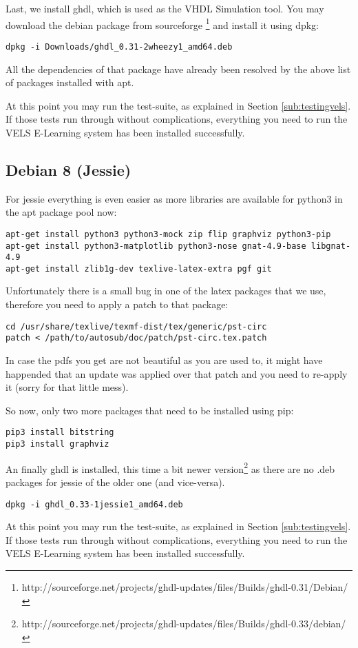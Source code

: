 Last, we install ghdl, which is used as the VHDL Simulation tool. You may download
the debian package from sourceforge \footnote{http://sourceforge.net/projects/ghdl-updates/files/Builds/ghdl-0.31/Debian/} and install it using dpkg:

\begin{verbatim}
dpkg -i Downloads/ghdl_0.31-2wheezy1_amd64.deb
\end{verbatim}

All the dependencies of that package have already been resolved by the above
list of packages installed with apt.

At this point you may run the test-suite, as explained in Section \ref{sub:testingvels}.
If those tests run through without complications, everything you need to run the VELS
E-Learning system has been installed successfully.



\subsection{Debian 8 (Jessie)}

For jessie everything is even easier as more libraries are available for python3 in the
apt package pool now:

\begin{verbatim}
apt-get install python3 python3-mock zip flip graphviz python3-pip
apt-get install python3-matplotlib python3-nose gnat-4.9-base libgnat-4.9
apt-get install zlib1g-dev texlive-latex-extra pgf git
\end{verbatim}

Unfortunately there is a small bug in one of the latex packages that we use,
therefore you need to apply a patch to that package:

\begin{verbatim}
cd /usr/share/texlive/texmf-dist/tex/generic/pst-circ
patch < /path/to/autosub/doc/patch/pst-circ.tex.patch
\end{verbatim}

In case the pdfs you get are not beautiful as you are used to, it might have
happended that an update was applied over that patch and you need to re-apply it (sorry for that little mess).

So now, only two more packages that need to be installed using pip:

\begin{verbatim}
pip3 install bitstring
pip3 install graphviz
\end{verbatim}

An finally ghdl is installed, this time a bit newer version\footnote{http://sourceforge.net/projects/ghdl-updates/files/Builds/ghdl-0.33/debian/} as there are no .deb packages for jessie of the older
one (and vice-versa).

\begin{verbatim}
dpkg -i ghdl_0.33-1jessie1_amd64.deb
\end{verbatim}

At this point you may run the test-suite, as explained in Section \ref{sub:testingvels}.
If those tests run through without complications, everything you need to run the VELS
E-Learning system has been installed successfully.
